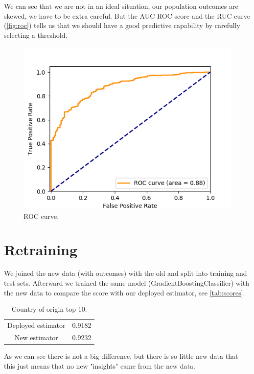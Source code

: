 \documentclass[a4paper]{article}
\begin{document}
    We can see that we are not in an ideal situation, our population outcomes
    are skewed, we have to be extra careful.
    But the AUC ROC score and the RUC curve (\vref{fig:roc}) tells us that we
    should have a good predictive capability by carefully selecting a
    threshold.

    \begin{figure}[!ht]
        \caption{ROC curve.}
        \label{fig:roc}
        \centering
        \includegraphics[width=\textwidth]{./img/roc.png}
    \end{figure}

    \section{Retraining}
    \label{sec:retrain}

    We joined the new data (with outcomes) with the old and split into
    training and test sets.
    Afterward we trained the same model (GradientBoostingClassifier) with the
    new data to compare the score with our deployed estimator, see
    \vref{tab:scores}.
    \begin{table}[!h]
        \caption{Country of origin top 10.}
        \label{tab:scores}

        \centering
        \begin{tabular}{cc}
            Deployed estimator & 0.9182 \\
            New estimator & 0.9232 \\
        \end{tabular}
    \end{table}

    As we can see there is not a big difference, but there is so little new
    data that this just means that no new "insights" came from the new data.

    \appendix
    

%
%
\end{document}
